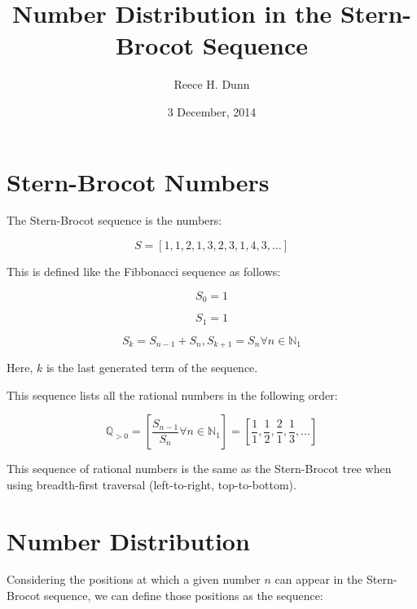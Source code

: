 \documentclass{article}
\title{Number Distribution in the Stern-Brocot Sequence}
\date{3 December, 2014}
\author{Reece H. Dunn}
\begin{document}
\maketitle

\section{Stern-Brocot Numbers}

The Stern-Brocot sequence is the numbers:

\begin{displaymath}
S = [1, 1, 2, 1, 3, 2, 3, 1, 4, 3, ...]
\end{displaymath}

\noindent
This is defined like the Fibbonacci sequence as follows:

\begin{displaymath}
S_0 = 1
\end{displaymath}

\begin{displaymath}
S_1 = 1
\end{displaymath}

\begin{displaymath}
S_k = S_{n-1} + S_n, S_{k+1} = S_n \forall n \in \mathbb{N}_1
\end{displaymath}

\noindent
Here, \begin{math}k\end{math} is the last generated term of the sequence.

\noindent
This sequence lists all the rational numbers in the following order:

\begin{displaymath}
\mathbb{Q}_{>0}
=
\left[
\frac{S_{n-1}}{S_n}
\forall n \in \mathbb{N}_{1}
\right]
=
\left[
\frac{1}{1},
\frac{1}{2},
\frac{2}{1},
\frac{1}{3},
...
\right]
\end{displaymath}

\noindent
This sequence of rational numbers is the same as the Stern-Brocot tree when
using breadth-first traversal (left-to-right, top-to-bottom).

\section{Number Distribution}

Considering the positions at which a given number \begin{math}n\end{math} can
appear in the Stern-Brocot sequence, we can define those positions as the
sequence:
\end{document}
